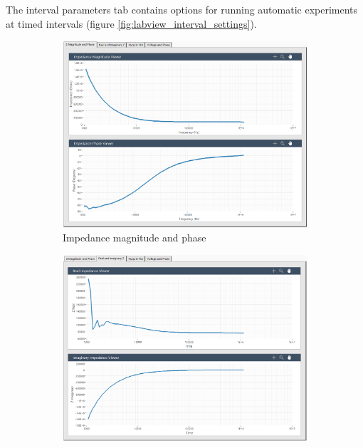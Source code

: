 \par The interval parameters tab contains options for running automatic experiments at timed intervals (figure \ref{fig:labview_interval_settings}). 

\begin{figure}[h]
    \centering
    \begin{subfigure}[b]{0.48\textwidth}
        \centering
        \includegraphics[width=\textwidth]{images/labview_mag_phase_graph.png}
        \caption{Impedance magnitude and phase}
        \label{fig:labview_mag-phase_graph}
    \end{subfigure}
    \hfill
    \begin{subfigure}[b]{0.48\textwidth}
        \centering
        \includegraphics[width=\textwidth]{images/labview_real_imag_graph.png}

\end{subfigure}
\end{figure}
